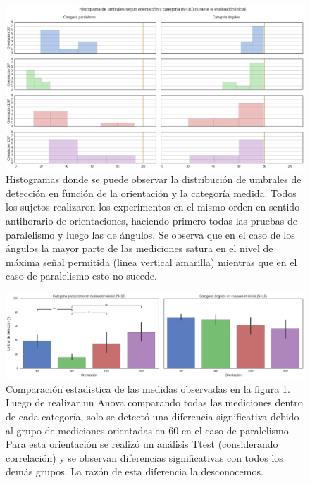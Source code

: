 \documentclass{article}
\begin{document}
    \begin{figure}
        \center
        \includegraphics[width=\textwidth]{Imagenes/TransferenciaInicialHisto.png}
        \caption{Histogramas donde se puede observar la distribución de umbrales de detección en función de la orientación y la categoría medida. Todos los sujetos realizaron los experimentos en el mismo orden en sentido antihorario de orientaciones, haciendo primero todas las pruebas de paralelismo y luego las de ángulos. Se observa que en el caso de los ángulos la mayor parte de las mediciones satura en el nivel de máxima señal permitida (linea vertical amarilla) mientras que en el caso de paralelismo esto no sucede.}
        \label{fig:Exp2_HistoInicial}
    \end{figure}  

    \begin{figure}
        \center
        \includegraphics[width=\textwidth]{Imagenes/TransferenciaInicialMedias.png}
        \caption{Comparación estadistica de las medidas observadas en la figura \ref{fig:Exp2_HistoInicial}. Luego de realizar un Anova comparando todas las mediciones dentro de cada categoría, solo se detectó una diferencia significativa debido al grupo de mediciones orientadas en 60 en el caso de paralelismo. Para esta orientación se realizó un análisis Ttest (considerando correlación) y se observan diferencias significativas con todos los demás grupos. La razón de esta diferencia la desconocemos.}
        \label{fig:Exp2_SignificanciaInicial}
    \end{figure}  
    
\end{document}
